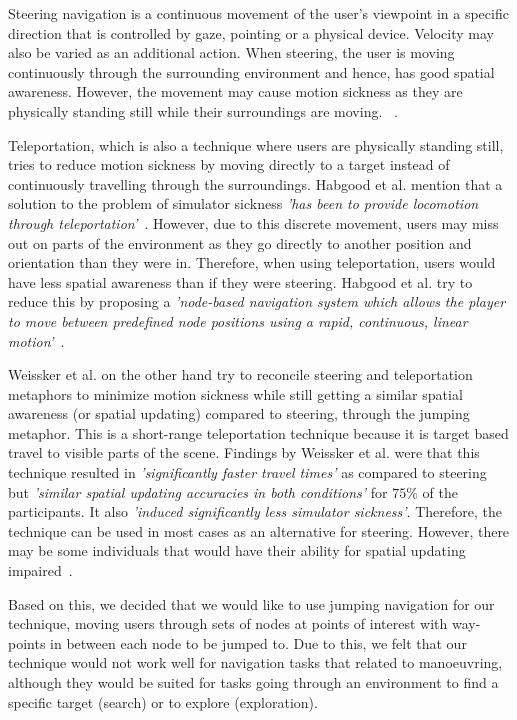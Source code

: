 Steering navigation is a continuous movement of the user's viewpoint in a specific direction that is controlled by gaze, pointing or a physical device. Velocity may also be varied as an additional action. When steering, the user is moving continuously through the surrounding environment and hence, has good spatial awareness. However, the movement may cause motion sickness as they are physically standing still while their surroundings are moving. ~\cite{Habgood2018}.

Teleportation, which is also a technique where users are physically standing still, tries to reduce motion sickness by moving directly to a target instead of continuously travelling through the surroundings. Habgood et al. mention that a solution to the problem of simulator sickness \textit{'has been to provide locomotion through teleportation'}~\cite{Habgood2018}. However, due to this discrete movement, users may miss out on parts of the environment as they go directly to another position and orientation than they were in. Therefore, when using teleportation, users would have less spatial awareness than if they were steering. Habgood et al. try to reduce this by proposing a \textit{'node-based navigation system which allows the player to move between predefined node positions using a rapid, continuous, linear motion'}~\cite{Habgood2018}.

Weissker et al. on the other hand try to reconcile steering and teleportation metaphors to minimize motion sickness while still getting a similar spatial awareness (or spatial updating) compared to steering, through the jumping metaphor. This is a short-range teleportation technique because it is target based travel to visible parts of the scene. Findings by Weissker et al. were that this technique resulted in \textit{'significantly faster travel times'} as compared to steering but \textit{'similar spatial updating accuracies in both conditions'} for $75\%$ of the participants. It also \textit{'induced significantly less simulator sickness'}. Therefore, the technique can be used in most cases as an alternative for steering. However, there may be some individuals that would have their ability for spatial updating impaired~\cite{Weissker2018}.

Based on this, we decided that we would like to use jumping navigation for our technique, moving users through sets of nodes at points of interest with way-points in between each node to be jumped to. Due to this, we felt that our technique would not work well for navigation tasks that related to manoeuvring, although they would be suited for tasks going through an environment to find a specific target (search) or to explore (exploration). 

